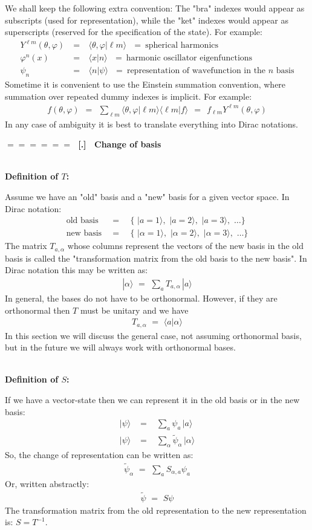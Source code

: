 \documentclass[onecolumn,fleqn]{revtex4}
\newcommand{\beq}{\begin{eqnarray}}
\newcommand{\eeq}{\end{eqnarray}}
\renewcommand{\thesubsection}{\arabic{subsection}}
\renewcommand{\thesubsubsection}{\arabic{subsubsection}}
\newcommand{\sheadC}[1]
{
\addtocounter{subsubsection}{1}
\vspace{5mm}
{\Large\bf $=\!=\!=\!=\!=\!=\;$ [\thesubsection.\thesubsubsection] \ #1}  
\nopagebreak
\phantomsection
}
\begin{document}
We shall keep the following extra convention: 
The "bra" indexes would appear as subscripts (used for representation), 
while the "ket" indexes would appear as superscripts (reserved for the specification of the state). 
For example: 
\beq
Y^{\ell m}(\theta,\varphi) \ &=& \  \langle \theta,\varphi | \ell m \rangle 
\ \ \ = \ \mbox{spherical harmonics} 
\\
\varphi^n(x) \ &=& \ \langle x | n \rangle
\ \ \ = \ \mbox{harmonic oscillator eigenfunctions}
\\
\psi_n \ &=& \ \langle n | \psi \rangle
\ \ \ = \ \mbox{representation of wavefunction in the $n$ basis}  
\eeq
Sometime it is convenient to use the Einstein summation 
convention, where summation over repeated dummy indexes is implicit. 
For example:
\beq
f(\theta,\varphi) 
\ \ = \ \ 
\sum_{\ell m}       
\langle \theta,\varphi | \ell m \rangle 
\langle \ell m | f \rangle 
\ \ = \ \ 
f_{\ell m} Y^{\ell m}(\theta,\varphi) 
\eeq
In any case of ambiguity it is best 
to translate everything into Dirac notations.  



\sheadC{Change of basis} 




\ \\
{\bf Definition of $T$:} 


Assume we have an "old" basis and a "new" basis for 
a given vector space. In Dirac notation: 
\beq
\mbox{old basis}\,\,\, &=& \,\,\, \{ \,\, |a=1\rangle, \,\, |a=2\rangle, \,\, |a=3\rangle, \,\, \dots  \} 
\\ \nonumber
\mbox{new basis}\,\,\, &=& \,\,\, \{ \,\, |\alpha=1\rangle, \,\, |\alpha=2\rangle, \,\, |\alpha=3\rangle, \,\, \dots  \} 
\eeq
The matrix ${T_{a,\alpha}}$ whose columns 
represent the vectors of the new basis in 
the old basis is called 
the "transformation matrix from the old basis 
to the new basis". In Dirac notation this may be written as:
\beq
| \alpha \rangle \,\, = \,\, \sum_a T_{a,\alpha} \, | a \rangle 
\eeq
In general, the bases do not have to be orthonormal. 
However, if they are orthonormal then ${T}$ must be 
unitary and we have
\beq
T_{a,\alpha} \,\, = \,\, \langle a | \alpha \rangle 
\eeq
In this section we will discuss the general case, 
not assuming orthonormal basis, but in the future 
we will always work with orthonormal bases.


 
\ \\
{\bf Definition of $S$:} 

If we have a vector-state then we can 
represent it in the old basis or in the new basis:
\beq
| \psi \rangle \,\, 
&=& \,\, \sum_a \psi_a \, | a \rangle 
\\ \nonumber
| \psi \rangle \,\, 
&=& \,\, \sum_{\alpha} \tilde{\psi}_{\alpha} \, | \alpha \rangle 
\eeq
So, the change of representation 
can be written as: 
\beq
\tilde{\psi}_{\alpha} \,\, 
= \,\, \sum_a S_{\alpha,a} \psi_a 
\eeq
Or, written abstractly:
\beq
\tilde{\psi} \,\, 
= \,\, S \psi 
\eeq
The transformation matrix from the old representation 
to the new representation is: ${S=T^{-1}}$.
\end{document}
